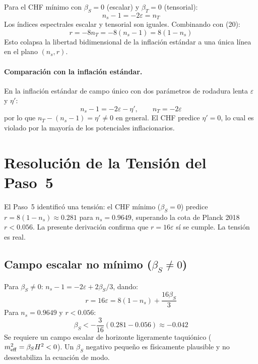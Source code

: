 \documentclass[12pt,a4paper]{article}
\begin{document}
Para el CHF mínimo con $\beta_S = 0$ (escalar) y $\beta_T = 0$ (tensorial):
\begin{equation}
n_s - 1 = -2\varepsilon = n_T \tag{21}
\end{equation}
Los índices espectrales escalar y tensorial son iguales. Combinando con (20):
\begin{equation}
r = -8n_T = -8(n_s - 1) = 8(1 - n_s) \tag{22}
\end{equation}
Esto colapsa la libertad bidimensional de la inflación estándar a una única línea en el plano $(n_s, r)$.

\paragraph{Comparación con la inflación estándar.} En la inflación estándar de campo único con dos parámetros de rodadura lenta $\varepsilon$ y $\eta'$:
\begin{equation}
n_s - 1 = -2\varepsilon - \eta', \qquad n_T = -2\varepsilon \tag{23}
\end{equation}
por lo que $n_T - (n_s - 1) = \eta' \neq 0$ en general. El CHF predice $\eta' = 0$, lo cual es violado por la mayoría de los potenciales inflacionarios.

\section{Resolución de la Tensión del Paso~5}

El Paso~5 identificó una tensión: el CHF mínimo ($\beta_S = 0$) predice $r = 8(1-n_s) \approx 0.281$ para $n_s = 0.9649$, superando la cota de Planck 2018 $r < 0.056$. La presente derivación confirma que $r = 16\varepsilon$ sí se cumple. La tensión es real.

\subsection{Campo escalar no mínimo ($\beta_S \neq 0$)}

Para $\beta_S \neq 0$: $n_s - 1 = -2\varepsilon + 2\beta_S/3$, dando:
\begin{equation}
r = 16\varepsilon = 8(1 - n_s) + \frac{16\beta_S}{3} \tag{24}
\end{equation}
Para $n_s = 0.9649$ y $r < 0.056$:
\begin{equation}
\beta_S < -\frac{3}{16}(0.281 - 0.056) \approx -0.042 \tag{25}
\end{equation}
Se requiere un campo escalar de horizonte ligeramente taquiónico ($m_{\rm eff}^2 = \beta_S H^2 < 0$). Un $\beta_S$ negativo pequeño es físicamente plausible y no desestabiliza la ecuación de modo.
\end{document}

